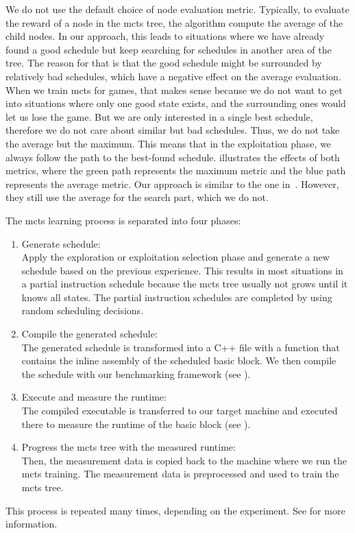 We do not use the default choice of node evaluation metric.
Typically, to evaluate the reward of a node in the \ac{mcts} tree, the algorithm compute the average of the child nodes.
In our approach, this leads to situations where we have already found a good schedule but keep searching for schedules in another area of the tree.
The reason for that is that the good schedule might be surrounded by relatively bad schedules, which have a negative effect on the average evaluation.
When we train \ac{mcts} for games, that makes sense because we do not want to get into situations where only one good state exists, and the surrounding ones would let us lose the game.
But we are only interested in a single best schedule, therefore we do not care about similar but bad schedules.
Thus, we do not take the average but the maximum.
This means that in the exploitation phase, we always follow the path to the best-found schedule.
 illustrates the effects of both metrics, where the green path represents the maximum metric and the blue path represents the average metric.
Our approach is similar to the one in~\cite{bjornsson2009cadiaplayer}.
However, they still use the average for the search part, which we do not.

The \ac{mcts} learning process is separated into four phases:
\begin{enumerate}
    \item Generate schedule: \\
    Apply the exploration or exploitation selection phase and generate a new schedule based on the previous experience.
    This results in most situations in a partial instruction schedule because the \ac{mcts} tree usually not grows until it knows all states.
    The partial instruction schedules are completed by using random scheduling decisions. 
    \item Compile the generated schedule: \\
    The generated schedule is transformed into a C++ file with a function that contains the inline assembly of the scheduled basic block.
    We then compile the schedule with our benchmarking framework (see ).
    \item Execute and measure the runtime: \\
    The compiled executable is transferred to our target machine and executed there to measure the runtime of the basic block (see ).
    \item Progress the \ac{mcts} tree with the measured runtime: \\
    Then, the measurement data is copied back to the machine where we run the \ac{mcts} training.
    The measurement data is preprocessed and used to train the \ac{mcts} tree.
\end{enumerate}
This process is repeated many times, depending on the experiment.
See  for more information.

